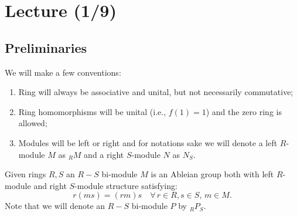 \section{Lecture (1/9)}
\subsection{Preliminaries}
We will make a few conventions:
\begin{enumerate}
\item Ring will always be associative and unital, but not necessarily commutative;
\item Ring homomorphisms will be unital (i.e., $f(1) = 1$) and the zero ring is allowed;
\item Modules will be left or right and for notations sake we will denote a left $R$-module $M$ as $_{R}M$ and a right $S$-module $N$ as $N_S$.
\end{enumerate}

\begin{defn}\label{1.2}
Given rings $R,S$ an $R-S$ bi-module $M$ is an Ableian group both with left $R$-module and right $S$-module structure satisfying:
$$r(ms) = (rm)s \quad \forall \, r \in R, s \in S,\, m \in M.$$
Note that we will denote an $R-S$ bi-module $P$ by $_{R}P_S$.
\end{defn}

